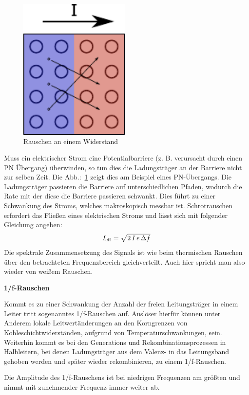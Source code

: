 \begin{figure}
  \centering
  \includegraphics[clip, width=0.49\textwidth]
  {./../common/bilder/schrotrauschen.pdf}
  \caption{Rauschen an einem Widerstand}\label{FIG:SHOTNOISE}
\end{figure}
Muss ein elektrischer Strom eine Potentialbarriere (z. B. verursacht 
durch einen PN Übergang) überwinden, so tun dies die Ladungsträger an der 
Barriere nicht zur selben Zeit. Die Abb.:~\ref{FIG:SHOTNOISE} zeigt dies
am Beispiel eines PN-Übergangs.
Die Ladungsträger passieren die Barriere auf unterschiedlichen Pfaden, 
wodurch die Rate mit der diese die Barriere passieren schwankt.
Dies führt zu einer Schwankung des Stroms, welches makroskopisch messbar ist.
Schrotrauschen erfordert das Fließen eines elektrischen Stroms und lässt sich 
mit folgender Gleichung angeben\cite[S. 541]{Art:SCHOTTKY}:
\[I_{\rm eff} = \sqrt{2\,I\,e\,\Delta f }\]
Die spektrale Zusammensetzung des Signals ist wie beim thermischen Rauschen
über den betrachteten Frequenzbereich gleichverteilt.
Auch hier spricht man also wieder von weißem Rauschen. 

\textbf{1/f-Rauschen}

Kommt es zu einer Schwankung der Anzahl der freien Leitungsträger
in einem Leiter tritt sogenanntes 1/f-Rauschen auf.
Auslöser hierfür können unter Anderem lokale Leitwertänderungen an den 
Korngrenzen von Kohleschichtwiderständen, aufgrund von Temperaturschwankungen, 
sein. Weiterhin kommt es bei den Generations und Rekombinationsprozessen in
Halbleitern, bei denen Ladungsträger aus dem Valenz- in das Leitungsband 
gehoben werden und später wieder rekombinieren, zu einem 
1/f-Rauschen.\cite[S.29]{BK:SENSORNOISE}

Die Amplitude des 1/f-Rauschens ist bei niedrigen Frequenzen am größten und
nimmt mit zunehmender Frequenz immer weiter ab.
